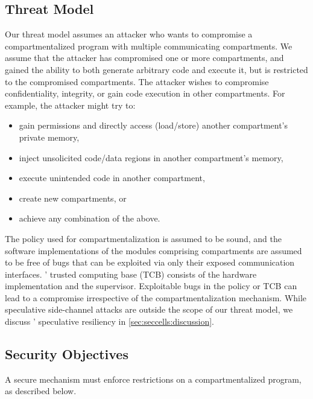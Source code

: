 \subsection{Threat Model}
\label{sec:seccells:reqs:threat}

Our threat model assumes an attacker who wants to compromise a 
compartmentalized program with multiple communicating compartments.
We assume that the attacker has compromised one or more compartments, and
gained the ability to both generate arbitrary code and execute it,
but is restricted to the compromised compartments.
The attacker wishes to compromise confidentiality, integrity, or 
gain code execution in other compartments.
%
For example, the attacker might try to:
\begin{itemize}
  \item gain permissions and directly access (load/store) 
        another compartment's private memory,
  \item inject unsolicited code/data regions in another 
        compartment's memory,
  \item execute unintended code in another compartment,
  \item create new compartments, or
  \item achieve any combination of the above.
\end{itemize}

The policy used for compartmentalization is assumed to be sound, and the software
implementations of the modules comprising compartments are assumed to be
free of bugs that can be exploited via only their exposed communication
interfaces.
\seccells' trusted computing base (TCB) consists of the hardware implementation
and the supervisor.
Exploitable bugs in the policy or TCB can lead to a compromise irrespective of the
compartmentalization mechanism.
While speculative side-channel attacks are outside the scope of our threat model,
we discuss \seccells' speculative resiliency in \autoref{sec:seccells:discussion}.

\subsection{Security Objectives}
\label{sec:seccells:reqs:security}
A secure mechanism must enforce restrictions on a compartmentalized program,
as described below.

